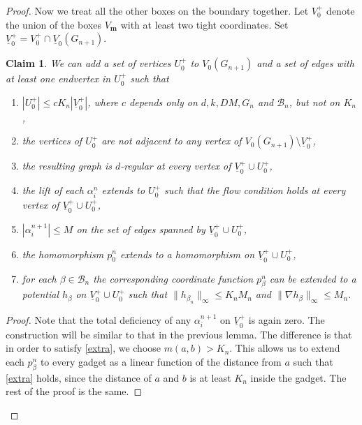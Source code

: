 \documentclass[10pt,a4paper]{amsart}
\newtheorem{claim}{Claim}
\begin{document}
\begin{proof}
Now we treat all the other boxes on the boundary together. Let $V_0^+$ denote the union of the boxes $V_{\mathbf{m}}$ with at least two tight coordinates. Set $\underline{V}_0^+=V_0^+ \cap \underline{V}_0(G_{n+1})$.

\begin{claim}\label{lemma:surgery2}
We can add a set of vertices $U_0^+$ to $V_0(G_{n+1})$ and a set of edges with at least one endvertex in $U_0^+$ such that 

\begin{enumerate}

\item 
$|U_0^+| \leq c K_n |\underline{V}_0^+|$, where $c$ depends only on $d, k, DM, G_n$ and $\mathcal{B}_n$, but not on $K_n$,

\item 
the vertices of $U_0^+$ are not adjacent to any vertex of 
$V_0(G_{n+1}) \setminus \underline{V}_0^+$,

\item 
the resulting graph is $d$-regular at every vertex of $\underline{V}_0^+ \cup U_0^+$,

\item
the lift of each $\alpha^n_i$ extends to $U_0^+$ such that the flow condition holds at every vertex of  $\underline{V}_0^+ \cup U_0^+$,

\item
$|\alpha^{n+1}_i| \leq M$ on the set of edges spanned by $\underline{V}_0^+ \cup U_0^+$,

\item
the homomorphism $p_0^n$ extends to a homomorphism on  $\underline{V}_0^+ \cup U_0^+$,


\item \label{extra} for each $\beta \in \mathcal{B}_n$ the corresponding coordinate function $p^n_{\beta}$ can be extended to a potential $h_{\beta}$ on $\underline{V}_0^+ \cup U_0^+$ such that $\|h_{\beta_{n}}\|_{\infty}\leq K_n M_n$ and $\| \nabla h_{\beta} \|_{\infty} \leq M_n$.
\end{enumerate} 
\end{claim}

\begin{proof}
Note that the total deficiency of any $\alpha_i^{n+1}$ on $\underline{V}_0^+$ is again zero. The construction will be similar to that in the previous lemma.  The difference is that in order to satisfy \ref{extra}, we choose $m(a,b)>K_n$. 
This allows us to extend each $p^n_{\beta}$ to every gadget as a linear function of the distance from $a$ such that \ref{extra} holds, since the distance of $a$ and $b$ is at least $K_n$ inside the gadget.
The rest of the proof is the same. 
\end{proof}


\end{proof}
\end{document}
